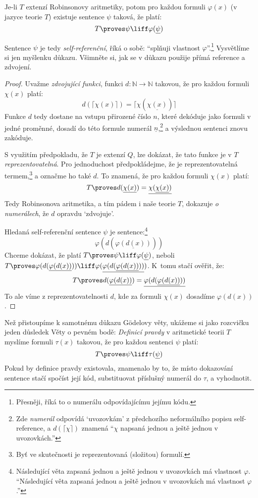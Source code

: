 \begin{theorem}
Je-li $T$ extenzí Robinsonovy aritmetiky, potom pro každou formuli $\varphi(x)$ (v jazyce teorie $T$) existuje sentence $\psi$ taková, že platí: 
$$
T\proves \psi \liff \varphi(\underline{\psi})
$$
\end{theorem}
Sentence $\psi$ je tedy \emph{self-referenční}, říká o sobě: ``splňuji vlastnost $\varphi$''.\footnote{Přesněji, říká to o numerálu odpovídajícímu jejímu kódu.} Vysvětlíme si jen myšlenku důkazu. Všimněte si, jak se v důkazu použije přímá reference a zdvojení.
\begin{proof} Uvažme \emph{zdvojující funkci}, funkci $d\colon\mathbb N\to\mathbb N$ takovou, že pro každou formuli $\chi(x)$ platí:
$$
d(\lceil \chi(x)\rceil)=\lceil\chi(\underline{\chi(x)})\rceil
$$
Funkce $d$ tedy dostane na vstupu přirozené číslo $n$, které dekóduje jako formuli v jedné proměnné, dosadí do této formule numerál $\underline{n}$,\footnote{Zde \emph{numerál} odpovídá `uvozovkám' z předchozího neformálního popisu self-reference, a $d(\lceil\chi\rceil)$ znamená ``$\chi$ napsaná jednou a ještě jednou v uvozovkách.''} a výslednou sentenci znovu zakóduje.

S využitím předpokladu, že $T$ je extenzí $Q$, lze dokázat, že tato funkce je v $T$ \emph{reprezentovatelná}. Pro jednoduchost předpokládejme, že je reprezentovatelná termem,\footnote{Byť ve skutečnosti je reprezentovaná (složitou) formulí.} a označme ho také $d$. To znamená, že pro každou formuli $\chi(x)$ platí:
$$
T\proves d(\underline{\chi(x)})=\underline{\chi(\underline{\chi(x)})}
$$
Tedy Robinsonova aritmetika, a tím pádem i naše teorie $T$, dokazuje \emph{o numerálech}, že $d$ opravdu `zdvojuje'.

Hledaná self-referenční sentence $\psi$ je sentence:\footnote{Následující věta zapsaná jednou a ještě jednou v uvozovkách má vlastnost $\varphi$. ``Následující věta zapsaná jednou a ještě jednou v uvozovkách má vlastnost $\varphi$.''}
$$
\varphi(d(\underline{\varphi(d(x))}))
$$
Chceme dokázat, že platí $T\proves \psi \liff \varphi(\underline{\psi})$, neboli $T \proves \varphi(d(\underline{\varphi(d(x))}))\liff\varphi(\underline{\varphi(d(\underline{\varphi(d(x))}))})$. K~tomu stačí ověřit, že:
$$
T \proves d(\underline{\varphi(d(x))})=\underline{\varphi(d(\underline{\varphi(d(x))}))}
$$
To ale víme z reprezentovatelnosti $d$, kde za formuli $\chi(x)$ dosadíme $\varphi(d(x))$.
\end{proof}

Než přistoupíme k samotnému důkazu Gödelovy věty, ukážeme si jako rozcvičku jeden důsledek Věty o pevném bodě: \emph{Definicí pravdy} v aritmetické teorii $T$ myslíme formuli $\tau(x)$ takovou, že pro každou sentenci $\psi$ platí: 
$$
T\proves\psi\liff\tau(\underline{\psi})
$$
Pokud by definice pravdy existovala, znamenalo by to, že místo dokazování sentence stačí spočíst její kód, substituovat příslušný numerál do $\tau$, a vyhodnotit.

